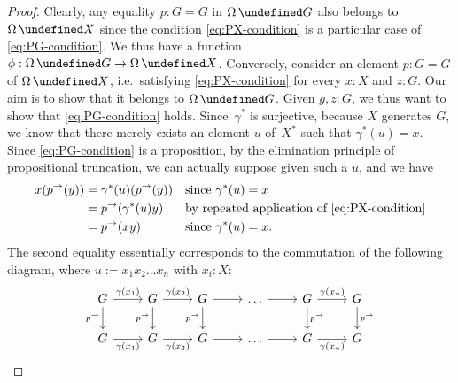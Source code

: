 \documentclass[10pt,a4paper]{amsart}
\theoremstyle{definition}
\newcommand{\freegroup}[1]{#1^*} %
\newcommand{\defd}{:=} %
\newcommand{\transport}[1]{#1^\to} %
\newcommand{\Loop}{\operatorname{\Omega}} %
\let\P\undefined
\newcommand{\P}[1]{\operatorname{P}_{#1}} %
\newcommand{\ie}{i.e.~}
\newcommand{\TODO}[1]{\marginpar{\tiny #1}}
\newcommand{\SM}[1]{\TODO{SM: #1}}
\newcommand{\EO}[1]{\TODO{EO: #1}}
\begin{document}
\begin{proof}
  Clearly, any equality $p:G=G$ in $\Loop\P G$ also belongs to $\Loop \P X$
  since the condition \cref{eq:PX-condition} is a particular case of
  \cref{eq:PG-condition}. We thus have a function
  $\phi:\Loop\P G\to\Loop \P X$.
  Conversely, consider an element $p:G=G$ of $\Loop \P X$, \ie satisfying
  \cref{eq:PX-condition} for every $x:X$ and $z:G$. Our aim is to show that it
  belongs to $\Loop\P G$. Given $g,z:G$, we thus want to show that
  \cref{eq:PG-condition} holds. Since~$\freegroup{\gamma}$ is surjective,
  because $X$ generates $G$, we know that there merely
  exists an element $u$ of~$\freegroup{X}$ such that
  $\freegroup{\gamma}(u)=x$. Since \cref{eq:PG-condition} is a proposition, by
  the elimination principle of propositional truncation, we can actually suppose
  given such a $u$, and we have
  \begin{align*}
    x(\transport p(y))
    &=\freegroup\gamma(u)(\transport p(y))&&\text{since $\freegroup{\gamma}(u)=x$}\\
    &=\transport p(\freegroup\gamma(u)y)&&\text{by repeated application of \cref{eq:PX-condition}}\\
    &=\transport p(xy)&&\text{since $\freegroup{\gamma}(u)=x$.}
  \end{align*}
  The second equality essentially corresponds to the commutation of the
  following diagram, where $u\defd x_1x_2\ldots x_n$ with $x_i:X$:
  \[
    \begin{tikzcd}
      G
      \ar[d,"\transport p"']
      \ar[r,"\gamma(x_1)"]
      &
      G
      \ar[d,"\transport p"']
      \ar[r,"\gamma(x_2)"]
      &
      G
      \ar[d,"\transport p"']
      \ar[r]
      &
      \ldots
      \ar[r]
      &
      G
      \ar[d,"\transport p"]
      \ar[r,"\gamma(x_n)"]
      &
      G
      \ar[d,"\transport p"]
      \\
      G
      \ar[r,"\gamma(x_1)"']
      &
      G
      \ar[r,"\gamma(x_2)"']
      &
      G
      \ar[r]
      &
      \ldots
      \ar[r]
      &
      G
      \ar[r,"\gamma(x_n)"']
      &
      G
    \end{tikzcd}
  \]

\end{proof}
\end{document}
